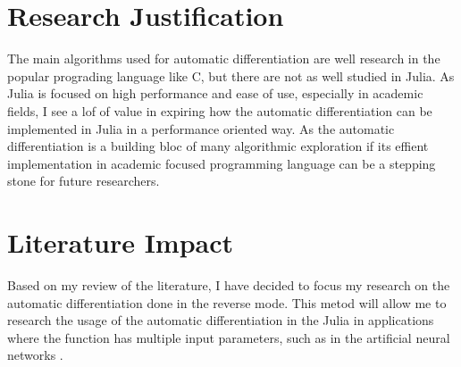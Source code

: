 \documentclass[conference,a4paper]{IEEEtran}
\begin{document}
\section{Research Justification}
The main algorithms used for automatic differentiation are well research in the popular prograding language like C, but there are not as well studied in Julia.
As Julia is focused on high performance and ease of use, especially in academic fields, I see a lof of value in expiring how the automatic differentiation can be implemented in Julia in a performance oriented way.
As the automatic differentiation is a building bloc of many algorithmic exploration if its effient implementation in academic focused programming language can be a stepping stone for future researchers.

\section{Literature Impact}
Based on my review of the literature, I have decided to focus my research on the automatic differentiation done in the reverse mode.
This metod will allow me to research the usage of the automatic differentiation in the Julia in applications where the function has multiple input parameters, such as in the artificial neural networks \cite{wang2003artificial}.



\end{document}
